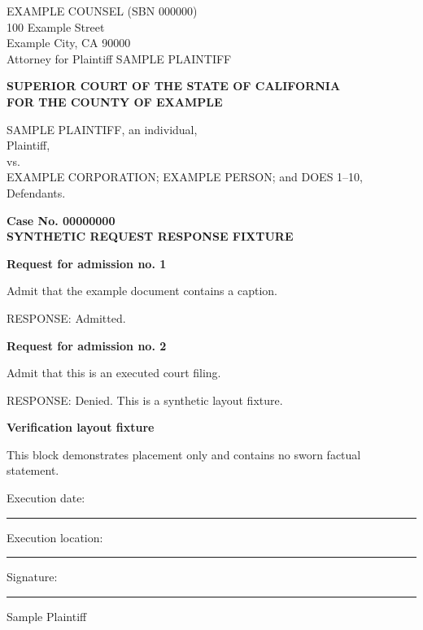 \documentclass[12pt,letterpaper]{article}
\begin{document}
\fontsize{12}{14}\selectfont
\begin{minipage}[t][180pt][t]{\textwidth}
EXAMPLE COUNSEL (SBN 000000)\\
100 Example Street\\
Example City, CA 90000\\
Attorney for Plaintiff SAMPLE PLAINTIFF
\end{minipage}
\begin{center}\bfseries SUPERIOR COURT OF THE STATE OF CALIFORNIA\\FOR THE COUNTY OF EXAMPLE\end{center}
\begin{minipage}[t]{0.55\textwidth}
SAMPLE PLAINTIFF, an individual,\\ Plaintiff,\\ vs.\\ EXAMPLE CORPORATION; EXAMPLE PERSON; and DOES 1--10,\\ Defendants.
\end{minipage}\hfill\vrule\hfill\begin{minipage}[t]{0.40\textwidth}
\textbf{Case No. 00000000}\\[12pt]
\textbf{SYNTHETIC REQUEST RESPONSE FIXTURE}
\end{minipage}
\par\vspace{24pt}
\fontsize{12}{24}\selectfont
\textbf{Request for admission no. 1}\par
Admit that the example document contains a caption.\par
RESPONSE: Admitted.\par
\vspace{24pt}
\textbf{Request for admission no. 2}\par
Admit that this is an executed court filing.\par
RESPONSE: Denied. This is a synthetic layout fixture.\par
\newpage
\begin{samepage}
\textbf{Verification layout fixture}\par
This block demonstrates placement only and contains no sworn factual statement.\par
Execution date: \rule{144pt}{0.4pt}\par
Execution location: \rule{144pt}{0.4pt}\par
Signature: \rule{180pt}{0.4pt}\par
Sample Plaintiff
\end{samepage}
\end{document}
